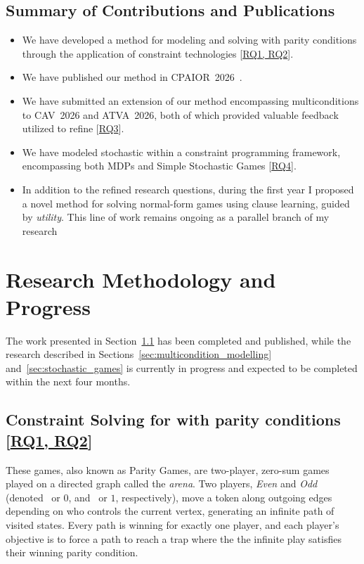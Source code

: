 \documentclass{article}
\begin{document}
\subsection{Summary of Contributions and Publications}

\begin{itemize}
  \item We have developed a method for modeling and solving \wregulargames with parity conditions through the application of constraint technologies [\hyperref[sec:rq]{RQ1, RQ2}].
  \item We have published our method in CPAIOR~2026~\cite{Hernandez:2026:noc}.
  \item We have submitted an extension of our method encompassing multiconditions to CAV~2026 and ATVA~2026, both of which provided valuable feedback utilized to refine [\hyperref[sec:rq]{RQ3}].
  \item We have modeled stochastic \wregulargames within a constraint programming framework, encompassing both MDPs and Simple Stochastic Games [\hyperref[sec:rq]{RQ4}].
  \item In addition to the refined research questions, during the first year I proposed a novel method for solving normal-form games using clause learning, guided by \textit{utility}. This line of work remains ongoing as a parallel branch of my research
\end{itemize}


\section{Research Methodology and Progress}

The work presented in Section~\ref{sec:paritygames} has been completed and published, while the research described in Sections~\ref{sec:multicondition_modelling} and~\ref{sec:stochastic_games} is currently in progress and expected to be completed within the next four months.

\subsection{Constraint Solving for \wregulargames with parity conditions [\hyperref[sec:rq]{RQ1, RQ2}]}\label{sec:paritygames}

These games, also known as Parity Games, are two-player, zero-sum games played on a directed graph called the \textit{arena}. Two players, \textit{Even} and \textit{Odd} (denoted~\even{} or $0$, and~\odd{} or $1$, respectively), move a token along outgoing edges depending on who controls the current vertex, generating an infinite path of visited states. Every path is winning for exactly one player, and each player's objective is to force a path to reach a trap where the the infinite play satisfies their winning parity condition.
\end{document}
